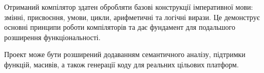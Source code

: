 \documentclass[12pt,a4paper]{article}
\begin{document}
Отриманий компілятор здатен обробляти базові конструкції імперативної мови: змінні, присвоєння, умови, цикли, арифметичні та логічні вирази. Це демонструє основні принципи роботи компіляторів та дає фундамент для подальшого розширення функціональності.

Проект може бути розширений додаванням семантичного аналізу, підтримки функцій, масивів, а також генерації коду для реальних цільових платформ.
\end{document}
